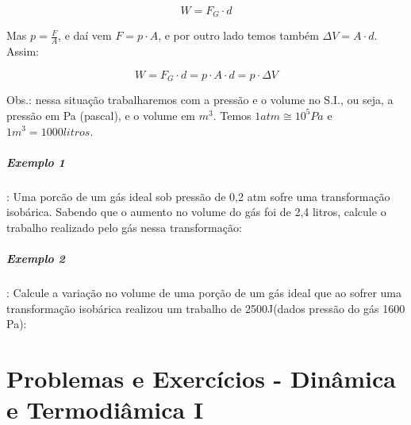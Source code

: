 \documentclass[12pt,a4paper]{book}
\begin{document}
$$W=F_G \cdot d$$

Mas $p=\frac{F}{A}$, e daí vem  $F=p \cdot A$, e por outro lado temos também $\Delta V = A \cdot d$. Assim:

$$W=F_G \cdot d = p \cdot A \cdot d = p \cdot \Delta V$$

Obs.: nessa situação trabalharemos com a pressão e o volume no S.I., ou seja, a pressão em Pa (pascal), e o volume em $m^3$. Temos $ 1 atm \cong 10^5 Pa$ e $ 1 m^3 = 1000 litros$.

			\subparagraph{Exemplo 1}: Uma porcão de um gás ideal sob pressão de 0,2 atm sofre uma transformação isobárica. Sabendo que o aumento no volume do gás foi de 2,4 litros, calcule o trabalho realizado pelo gás nessa transformação:
			
			\subparagraph{Exemplo 2}: Calcule a variação no volume de uma porção de um gás ideal que ao sofrer uma transformação isobárica realizou um trabalho de 2500J(dados pressão do gás 1600 Pa):

	\newpage \section{Problemas e Exercícios - Dinâmica e Termodiâmica I} 
\end{document}
